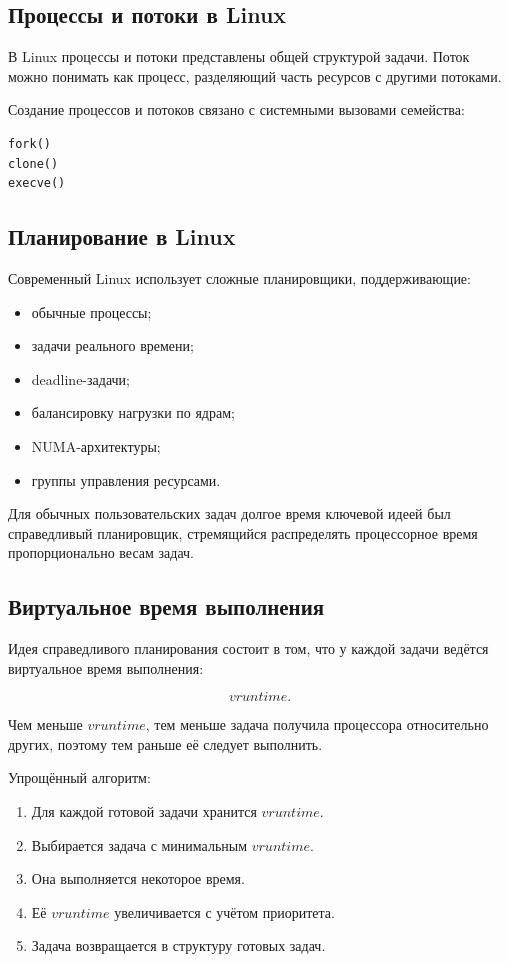 \documentclass[12pt,a4paper]{article}
\begin{document}
\subsection{Процессы и потоки в Linux}

В Linux процессы и потоки представлены общей структурой задачи. Поток можно понимать как процесс, разделяющий часть ресурсов с другими потоками.

Создание процессов и потоков связано с системными вызовами семейства:

\begin{lstlisting}[style=code]
fork()
clone()
execve()
\end{lstlisting}

\subsection{Планирование в Linux}

Современный Linux использует сложные планировщики, поддерживающие:

\begin{itemize}
    \item обычные процессы;
    \item задачи реального времени;
    \item deadline-задачи;
    \item балансировку нагрузки по ядрам;
    \item NUMA-архитектуры;
    \item группы управления ресурсами.
\end{itemize}

Для обычных пользовательских задач долгое время ключевой идеей был справедливый планировщик, стремящийся распределять процессорное время пропорционально весам задач.

\subsection{Виртуальное время выполнения}

Идея справедливого планирования состоит в том, что у каждой задачи ведётся виртуальное время выполнения:

\[
vruntime.
\]

Чем меньше $vruntime$, тем меньше задача получила процессора относительно других, поэтому тем раньше её следует выполнить.

Упрощённый алгоритм:

\begin{enumerate}
    \item Для каждой готовой задачи хранится $vruntime$.
    \item Выбирается задача с минимальным $vruntime$.
    \item Она выполняется некоторое время.
    \item Её $vruntime$ увеличивается с учётом приоритета.
    \item Задача возвращается в структуру готовых задач.
\end{enumerate}
\end{document}
